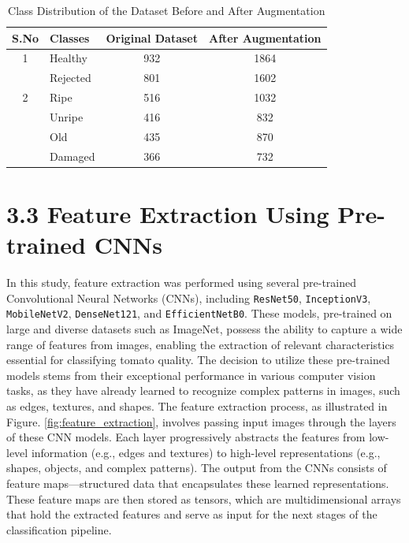 \documentclass[12pt,a4paper]{report}
\begin{document}
	\begin{table}[h]
		\renewcommand\thetable{3.1}
		\centering
		\caption{Class Distribution of the Dataset Before and After Augmentation}
		\renewcommand{\arraystretch}{1.8} %
		\begin{tabular}{|c|l|c|c|}
			\hline
			\textbf{S.No} & \textbf{Classes} & \textbf{Original Dataset} & \textbf{After Augmentation} \\ \hline
			1 & Healthy & 932 & 1864 \\ 
			& Rejected & 801 & 1602 \\ \hline
			2 & Ripe & 516 & 1032 \\ 
			& Unripe & 416 & 832 \\ 
			& Old & 435 & 870 \\ 
			& Damaged & 366 & 732 \\ \hline
		\end{tabular}
		\label{tab:class_distribution}
	\end{table}
	
	
	
	\section*{3.3 Feature Extraction Using Pre-trained CNNs}
\hspace{1cm}	In this study, feature extraction was performed using several pre-trained Convolutional Neural Networks (CNNs), including \texttt{ResNet50}, \texttt{InceptionV3}, \texttt{MobileNetV2}, \texttt{DenseNet121}, and \texttt{EfficientNetB0}. These models, pre-trained on large and diverse datasets such as ImageNet, possess the ability to capture a wide range of features from images, enabling the extraction of relevant characteristics essential for classifying tomato quality. The decision to utilize these pre-trained models stems from their exceptional performance in various computer vision tasks, as they have already learned to recognize complex patterns in images, such as edges, textures, and shapes. The feature extraction process, as illustrated in Figure. \ref{fig:feature_extraction}, involves passing input images through the layers of these CNN models. Each layer progressively abstracts the features from low-level information (e.g., edges and textures) to high-level representations (e.g., shapes, objects, and complex patterns). The output from the CNNs consists of feature maps—structured data that encapsulates these learned representations. These feature maps are then stored as tensors, which are multidimensional arrays that hold the extracted features and serve as input for the next stages of the classification pipeline.
	
\end{document}
